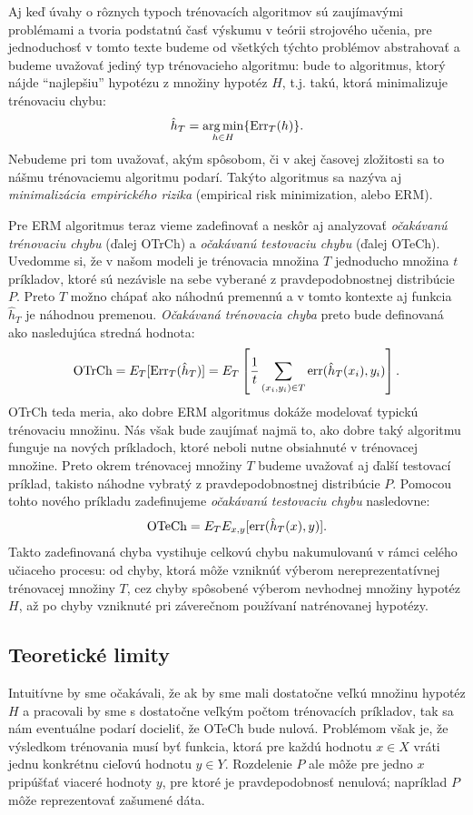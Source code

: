 Aj keď úvahy o rôznych typoch trénovacích algoritmov sú zaujímavými
problémami a tvoria podstatnú časť výskumu v teórii strojového učenia,
pre jednoduchosť v tomto texte budeme od všetkých týchto problémov
abstrahovať a budeme uvažovať jediný typ trénovacieho algoritmu:
bude to algoritmus, ktorý nájde ``najlepšiu'' hypotézu z množiny hypotéz $H$,
t.j. takú, ktorá minimalizuje trénovaciu chybu:
$$\hat{h}_T = \operatorname*{{arg\,min}}_{h \in H}\{\mathrm{Err}_T(h)\}. $$ Nebudeme pri tom
uvažovať, akým spôsobom, či v akej časovej zložitosti sa to nášmu
trénovaciemu algoritmu podarí. Takýto algoritmus sa nazýva aj
\emph{minimalizácia empirického rizika} (empirical risk minimization, alebo ERM).

Pre ERM algoritmus teraz vieme zadefinovať a neskôr aj
analyzovať \emph{očakávanú trénovaciu chybu} (ďalej OTrCh)
a \emph{očakávanú testovaciu chybu} (ďalej OTeCh).  Uvedomme si, že v
našom modeli je trénovacia množina $T$ jednoducho množina $t$
príkladov, ktoré sú nezávisle na sebe vyberané z pravdepodobnostnej
distribúcie $P$. Preto $T$ možno chápať ako náhodnú premennú a v tomto
kontexte aj funkcia $\hat{h}_T$ je náhodnou premenou. \emph{Očakávaná
trénovacia chyba} preto bude definovaná ako nasledujúca stredná
hodnota:
$$\text{OTrCh} = E_T[\mathrm{Err}_T(\hat{h}_T)] =
               E_{T}\left[\frac{1}{t}\sum_{(x_i,y_i)\in T}
                \mathrm{err}(\hat{h}_T(x_i),y_i)\right].$$
OTrCh teda meria, ako dobre ERM algoritmus dokáže modelovať typickú
trénovaciu množinu. Nás však bude zaujímať najmä to, ako dobre taký
algoritmu funguje na nových príkladoch, ktoré neboli nutne obsiahnuté
v trénovacej množine. Preto okrem trénovacej množiny $T$ budeme uvažovať
aj ďalší testovací príklad, takisto náhodne vybratý z pravdepodobnostnej
distribúcie $P$. Pomocou tohto nového príkladu zadefinujeme \emph{očakávanú
testovaciu chybu} nasledovne:
$$\text{OTeCh} = E_T E_{x,y} [ \mathrm{err}(\hat{h}_T(x),y) ].$$
Takto zadefinovaná chyba vystihuje celkovú chybu nakumulovanú v rámci
celého učiaceho procesu: od chyby, ktorá môže vzniknúť výberom
nereprezentatívnej trénovacej množiny $T$, cez chyby spôsobené výberom
nevhodnej množiny hypotéz $H$, až po chyby vzniknuté pri záverečnom
používaní natrénovanej hypotézy.

\subsection{Teoretické limity}

Intuitívne by sme očakávali, že ak by sme mali dostatočne veľkú
množinu hypotéz $H$ a pracovali by sme s dostatočne veľkým počtom
trénovacích príkladov, tak sa nám eventuálne podarí docieliť, že OTeCh
bude nulová. Problémom však je, že výsledkom trénovania musí byť funkcia,
ktorá pre každú hodnotu $x\in X$ vráti jednu konkrétnu cieľovú hodnotu
$y\in Y$.  Rozdelenie $P$ ale
môže pre jedno $x$ pripúšťať viaceré hodnoty $y$, pre ktoré je pravdepodobnosť
nenulová; napríklad $P$ môže reprezentovať zašumené dáta.

